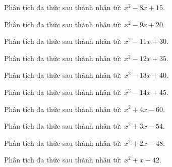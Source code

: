 \begin{bt}
	Phân tích đa thức sau thành nhân tử: $x^2 - 8 x + 15$.
\end{bt}
\begin{bt}
	Phân tích đa thức sau thành nhân tử: $x^2 - 9 x + 20$.
\end{bt}
\begin{bt}
	Phân tích đa thức sau thành nhân tử: $x^2 - 11 x + 30$.
\end{bt}
\begin{bt}
	Phân tích đa thức sau thành nhân tử: $x^2 - 12 x + 35$.
\end{bt}
\begin{bt}
	Phân tích đa thức sau thành nhân tử: $x^2 - 13 x + 40$.
\end{bt}
\begin{bt}
	Phân tích đa thức sau thành nhân tử: $x^2 - 14 x + 45$.
\end{bt}
\begin{bt}
	Phân tích đa thức sau thành nhân tử: $x^2 + 4 x - 60$.
\end{bt}
\begin{bt}
	Phân tích đa thức sau thành nhân tử: $x^2 + 3 x - 54$.
\end{bt}
\begin{bt}
	Phân tích đa thức sau thành nhân tử: $x^2 + 2 x - 48$.
\end{bt}
\begin{bt}
	Phân tích đa thức sau thành nhân tử: $x^2 + x - 42$.
\end{bt}
